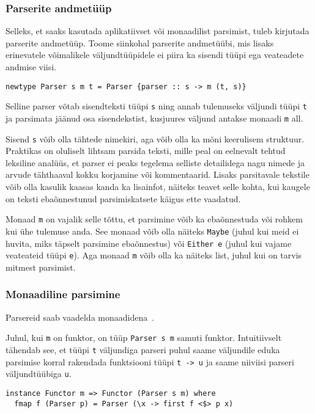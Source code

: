 \documentclass[12pt]{article}
\begin{document}
      \subsubsection{Parserite andmetüüp}\label{parserityyp}
        Selleks, et saaks kasutada aplikatiivset või monaadilist parsimist, tuleb kirjutada parserite andmetüüp. Toome siinkohal parserite andmetüübi, mis lisaks erinevatele võimalikele väljundtüüpidele ei piira ka sisendi tüüpi ega veateadete andmise viisi.

        \begin{verbatim}newtype Parser s m t = Parser {parser :: s -> m (t, s)}\end{verbatim}

        Selline parser võtab sisendteksti tüüpi \verb!s! ning annab tulemuseks väljundi tüüpi \verb!t! ja parsimata jäänud osa sisendekstist, kusjuures väljund antakse monaadi \verb!m! all.

        Sisend \verb!s! võib olla tähtede nimekiri, aga võib olla ka mõni keerulisem struktuur. Praktikas on oluliselt lihtsam parsida teksti, mille peal on eelnevalt tehtud leksiline analüüs, et parser ei peaks tegelema selliste detailidega nagu nimede ja arvude tähthaaval kokku korjamine või kommentaarid. Lisaks parsitavale tekstile võib olla kasulik kaasas kanda ka lisainfot, näiteks teavet selle kohta, kui kaugele on teksti ebaõnnestunud parsimiskatsete käigus ette vaadatud.

        Monaad \verb!m! on vajalik selle tõttu, et parsimine võib ka ebaõnnestuda või rohkem kui ühe tulemuse anda. See monaad võib olla näiteks \verb!Maybe! (juhul kui meid ei huvita, miks täpselt parsimine ebaõnnestus) või \verb!Either e! (juhul kui vajame veateateid tüüpi \verb!e!). Aga monaad \verb!m! võib olla ka näiteks list, juhul kui on tarvis mitmest parsimist.
      \subsubsection{Monaadiline parsimine}
        Parsereid saab vaadelda monaadidena~\cite{Mon}.

        Juhul, kui \verb!m! on funktor, on tüüp \verb!Parser s m! samuti funktor. Intuitiivselt tähendab see, et tüüpi \verb!t! väljundiga parseri puhul saame väljundile eduka parsimise korral rakendada funktsiooni tüüpi \verb!t -> u! ja saame niiviisi parseri väljundtüübiga \verb!u!.

        \begin{verbatim}instance Functor m => Functor (Parser s m) where
  fmap f (Parser p) = Parser (\x -> first f <$> p x)\end{verbatim}
\end{document}
